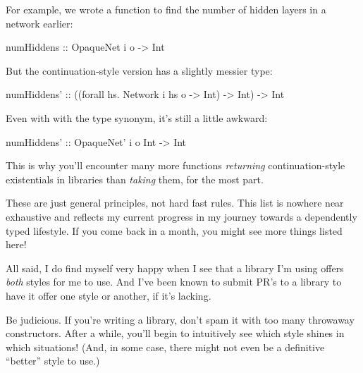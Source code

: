 \documentclass[]{article}
\newenvironment{Shaded}{}{}
\newcommand{\DataTypeTok}[1]{\textcolor[rgb]{0.56,0.13,0.00}{{#1}}}
\newcommand{\OtherTok}[1]{\textcolor[rgb]{0.00,0.44,0.13}{{#1}}}
\newcommand{\FunctionTok}[1]{\textcolor[rgb]{0.02,0.16,0.49}{{#1}}}
\newcommand{\NormalTok}[1]{{#1}}
\begin{document}
\begin{itemize}
  For example, we wrote a function to find the number of hidden layers in a
  network earlier:

\begin{Shaded}
\begin{Highlighting}[]
\OtherTok{numHiddens ::} \DataTypeTok{OpaqueNet} \NormalTok{i o }\OtherTok{->} \DataTypeTok{Int}
\end{Highlighting}
\end{Shaded}

  But the continuation-style version has a slightly messier type:

\begin{Shaded}
\begin{Highlighting}[]
\OtherTok{numHiddens' ::} \NormalTok{((forall hs}\FunctionTok{.} \DataTypeTok{Network} \NormalTok{i hs o }\OtherTok{->} \DataTypeTok{Int}\NormalTok{) }\OtherTok{->} \DataTypeTok{Int}\NormalTok{)}
            \OtherTok{->} \DataTypeTok{Int}
\end{Highlighting}
\end{Shaded}

  Even with with the type synonym, it's still a little awkward:

\begin{Shaded}
\begin{Highlighting}[]
\OtherTok{numHiddens' ::} \DataTypeTok{OpaqueNet'} \NormalTok{i o }\DataTypeTok{Int} \OtherTok{->} \DataTypeTok{Int}
\end{Highlighting}
\end{Shaded}

  This is why you'll encounter many more functions \emph{returning}
  continuation-style existentials in libraries than \emph{taking} them, for the
  most part.
\end{itemize}

These are just general principles, not hard fast rules. This list is nowhere
near exhaustive and reflects my current progress in my journey towards a
dependently typed lifestyle. If you come back in a month, you might see more
things listed here!

All said, I do find myself very happy when I see that a library I'm using offers
\emph{both} styles for me to use. And I've been known to submit PR's to a
library to have it offer one style or another, if it's lacking.

Be judicious. If you're writing a library, don't spam it with too many throwaway
constructors. After a while, you'll begin to intuitively see which style shines
in which situations! (And, in some case, there might not even be a definitive
``better'' style to use.)
\end{document}
